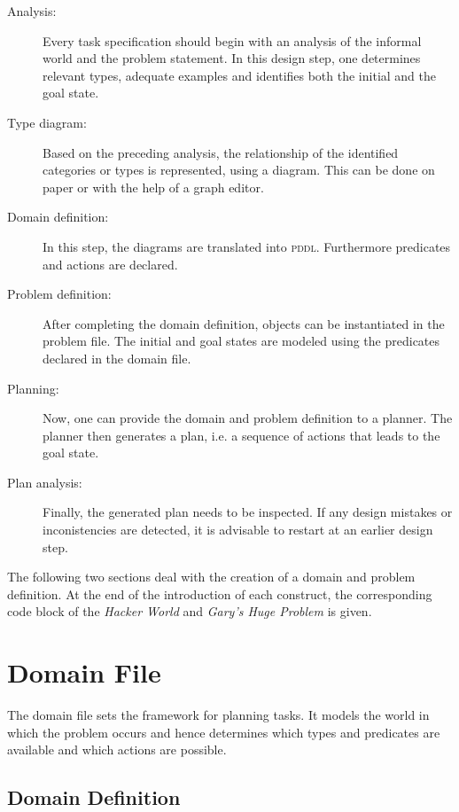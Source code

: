 \documentclass[a4paper,12pt]{report}
\begin{document}
\begin{description}
\item[{Analysis:}] Every task specification should begin with an analysis
of the informal world and the problem statement. In
this design step, one determines relevant types,
adequate examples and identifies both the initial and
the goal state.

\item[{Type diagram:}] Based on the preceding analysis, the relationship
of the identified categories or types is
represented, using a diagram. This can be done on
paper or with the help of a graph editor.

\item[{Domain definition:}] In this step, the diagrams are translated into
\textsc{pddl}. Furthermore predicates and actions are declared.

\item[{Problem definition:}] After completing the domain definition,
objects can be instantiated in the problem file. The initial and
goal states are modeled using the predicates declared in the
domain file.

\item[{Planning:}] Now, one can provide the domain and problem definition
to a planner. The planner then generates a plan, i.e. a
sequence of actions that leads to the goal state.

\item[{Plan analysis:}] Finally, the generated plan needs to be inspected.
If any design mistakes or inconistencies are
detected, it is advisable to restart at an earlier
design step.
\end{description}

The following two sections deal with the creation of a domain and
problem definition. At the end of the introduction of each construct,
the corresponding code block of the \emph{Hacker World} and \emph{Gary's Huge
Problem} is given.
\section{Domain File}
\label{sec-2-2}

The domain file sets the framework for planning tasks. It models the
world in which the problem occurs and hence determines which types and
predicates are available and which actions are possible.

\subsection{Domain Definition}
\label{sec-2-2-1}
\end{document}
